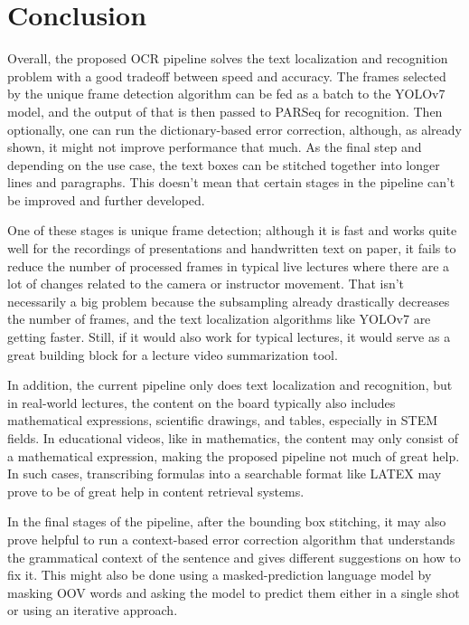 \chapter{Conclusion}

Overall, the proposed OCR pipeline solves the text localization and recognition problem with a good tradeoff between speed and accuracy. The frames selected by the unique frame detection algorithm can be fed as a batch to the YOLOv7 model, and the output of that is then passed to PARSeq for recognition. Then optionally, one can run the dictionary-based error correction, although, as already shown, it might not improve performance that much. As the final step and depending on the use case, the text boxes can be stitched together into longer lines and paragraphs. This doesn't mean that certain stages in the pipeline can't be improved and further developed.

One of these stages is unique frame detection; although it is fast and works quite well for the recordings of presentations and handwritten text on paper, it fails to reduce the number of processed frames in typical live lectures where there are a lot of changes related to the camera or instructor movement. That isn't necessarily a big problem because the subsampling already drastically decreases the number of frames, and the text localization algorithms like YOLOv7 are getting faster. Still, if it would also work for typical lectures, it would serve as a great building block for a lecture video summarization tool.

In addition, the current pipeline only does text localization and recognition, but in real-world lectures, the content on the board typically also includes mathematical expressions, scientific drawings, and tables, especially in STEM fields. In educational videos, like in mathematics, the content may only consist of a mathematical expression, making the proposed pipeline not much of great help. In such cases, transcribing formulas into a searchable format like LATEX may prove to be of great help in content retrieval systems.

In the final stages of the pipeline, after the bounding box stitching, it may also prove helpful to run a context-based error correction algorithm that understands the grammatical context of the sentence and gives different suggestions on how to fix it. This might also be done using a masked-prediction language model by masking OOV words and asking the model to predict them either in a single shot or using an iterative approach.